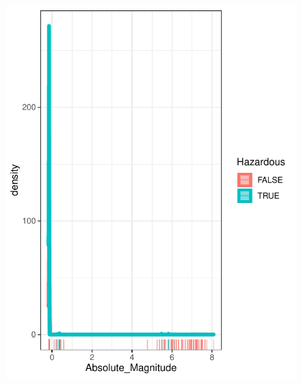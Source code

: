 \documentclass{beamer}
\begin{document}
\begin{frame}
\begin{columns}
\begin{figure}[b]{\textwidth}
    \includegraphics[width=\textwidth]{Pic/DENSITY_Absolute_magnitude.pdf}
    \vspace{4ex}
  \end{figure}
\end{columns}
\end{frame}
\end{document}
